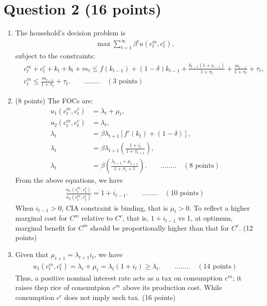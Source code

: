 \documentclass[12pt]{article}
\begin{document}
\section*{Question 2 (16 points)}
\begin{enumerate}[label=\arabic*.]
    \item The household's decision problem is
    \begin{align*}
        \max \sum_{t=1}^{\infty} \beta^t u(c_t^m, c_t^c),
    \end{align*}
    subject to the constraints:
    \begin{align*}
        & c_t^m + c_t^c + k_t + b_t + m_t \leq f(k_{t-1}) + (1-\delta) k_{t-1} + \frac{b_{t-1}(1+i_{t-1})}{1+\pi_t} + \frac{m_{t-1}}{1+\pi_t} + \tau_t, \\
        & c_t^m \leq \frac{m_{t-1}}{1+\pi_t} + \tau_t. \qquad ........ \quad(3 \text{ points})
    \end{align*}
    \item (8 points) The FOCs are:
    \begin{align*}
        u_1(c_t^m, c_t^c) &= \lambda_t + \mu_t, \\
        u_2(c_t^m, c_t^c) &= \lambda_t, \\
        \lambda_t &= \beta \lambda_{t+1}[f'(k_t) + (1-\delta)], \\
        \lambda_t &= \beta \lambda_{t+1}\left(\frac{1+i_t}{1+\pi_{t+1}}\right),\\
        \lambda_t &= \beta \left(\frac{\lambda_{t+1} + \mu_{t+1}}{1+\pi_t+1}\right). \qquad ........ \quad(8 \text{ points})
    \end{align*}
    From the above equations, we have
    \begin{align*}
        \frac{u_1(c_t^m, c_t^c)}{u_2(c_t^m, c_t^c)} = 1+i_{t-1}. \qquad ........ \quad(10 \text{ points}) 
    \end{align*}
    When $i_{t-1} > 0$, CIA constraint is binding, that is $\mu_t > 0$. To reflect a higher marginal cost for $C^m$ relative to $C^c$, that is, $1+i_{t-1}$ vs 1, at optimum, marginal benefit for $C^m$ should be proportionally higher than that for $C^c$. (12 points)
    \item Given that $\mu_{t+1} = \lambda_{t+1} i_t$, we have
    \begin{align*}
        u_1(c_t^m, c_t^c) = \lambda_t + \mu_t = \lambda_t (1+i_t) \geq \lambda_t. \qquad ........ \quad(14 \text{ points})
    \end{align*}
    Thus, a positive nominal interest rate acts as a tax on consumption $c^m$; it raises thep rice of consumtpion $c^m$ above its production cost. While consumption $c^c$ does not imply usch tax. (16 points)
\end{enumerate}
\end{document}
